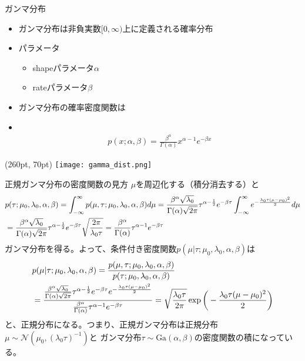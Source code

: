 \documentclass[aspectratio=169,unicode,dvipdfmx,14pt]{beamer}
\begin{document}
\begin{frame}{ガンマ分布}
\begin{itemize}
\item ガンマ分布は非負実数$[0,\infty)$上に定義される確率分布
\item パラメータ
\begin{itemize}
\item shapeパラメータ$\alpha$
\item rateパラメータ$\beta$
\end{itemize}
\item ガンマ分布の確率密度関数は
\item[] \
\begin{align}
p(x;\alpha,\beta)=\frac{\beta^\alpha}{\Gamma(\alpha)}x^{\alpha-1}e^{-\beta x}
\end{align}
\end{itemize}
\begin{textblock*}{0.4\linewidth}(260pt, 70pt)
    \centering
    \texttt{[image: gamma\_dist.png]}
\end{textblock*}
\end{frame}

\begin{frame}{正規ガンマ分布の密度関数の見方}
\FontMath
$\mu$を周辺化する（積分消去する）と
\begin{align}
& p(\tau ; \mu_0, \lambda_0, \alpha, \beta) = \int_{-\infty}^\infty p(\mu, \tau ; \mu_0, \lambda_0, \alpha, \beta) d\mu
= \frac{\beta^\alpha\sqrt{\lambda_0}}{\Gamma(\alpha)\sqrt{2\pi}}
\tau^{\alpha-\frac{1}{2}}e^{-\beta\tau}
\int_{-\infty}^\infty e^{-\frac{\lambda_0\tau(\mu - \mu_0)^2}{2}} d\mu
\notag \\ &
= \frac{\beta^\alpha\sqrt{\lambda_0}}{\Gamma(\alpha)\sqrt{2\pi}}
\tau^{\alpha-\frac{1}{2}}e^{-\beta\tau}
\sqrt{ \frac{2\pi}{\lambda_0\tau} }
= \frac{\beta^\alpha}{\Gamma(\alpha)}
\tau^{\alpha-1}e^{-\beta\tau}
\end{align}
ガンマ分布を得る。よって、条件付き密度関数$p(\mu | \tau ; \mu_0, \lambda_0, \alpha, \beta)$は
\begin{align}
& p(\mu | \tau ; \mu_0, \lambda_0, \alpha, \beta)
= \frac{ p(\mu, \tau ; \mu_0, \lambda_0, \alpha, \beta) }{ p(\tau ; \mu_0, \lambda_0, \alpha, \beta) }
\notag \\ &
= \frac{ \frac{\beta^\alpha\sqrt{\lambda_0}}{\Gamma(\alpha)\sqrt{2\pi}}
\tau^{\alpha-\frac{1}{2}}e^{-\beta\tau}e^{-\frac{\lambda_0\tau(\mu - \mu_0)^2}{2}} }
{ \frac{\beta^\alpha}{\Gamma(\alpha)}
\tau^{\alpha-1}e^{-\beta\tau} }
= \sqrt{ \frac{ \lambda_0\tau }{ 2\pi } } \exp\bigg( - \frac{\lambda_0\tau(\mu - \mu_0)^2}{2} \bigg)
\end{align}
と、正規分布になる。つまり、正規ガンマ分布は正規分布$\mu \sim \mathcal{N}(\mu_0, (\lambda_0\tau)^{-1})$と
ガンマ分布$\tau \sim \mbox{Ga}(\alpha, \beta)$の密度関数の積になっている。
\end{frame}
\end{document}

